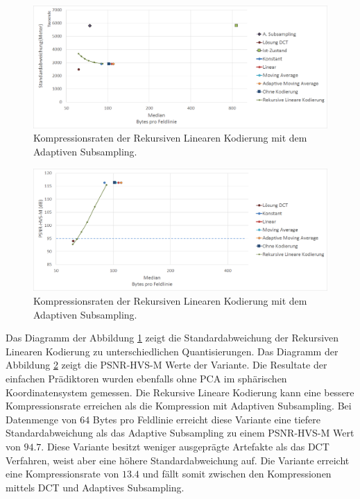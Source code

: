 \begin{figure}[!htbp]
	\center
	\includegraphics[width=1\textwidth,keepaspectratio]{./pictures/resultate/loesung2/variante2/resultate.png}
	
	\caption{Kompressionsraten der Rekursiven Linearen Kodierung mit dem Adaptiven Subsampling.}
	\label{resultate:loesung2:adaptive:median}
\end{figure}
\begin{figure}[!htbp]
	\includegraphics[width=1\textwidth,keepaspectratio]{./pictures/resultate/loesung2/variante2/resultate_psnr.png}
	
	\caption{Kompressionsraten der Rekursiven Linearen Kodierung mit dem Adaptiven Subsampling.}
	\label{resultate:loesung2:adaptive:median_psnr}
\end{figure}
Das Diagramm der Abbildung \ref{resultate:loesung2:adaptive:median} zeigt die Standardabweichung der Rekursiven Linearen Kodierung zu unterschiedlichen Quantisierungen. Das Diagramm der Abbildung \ref{resultate:loesung2:adaptive:median_psnr} zeigt die PSNR-HVS-M Werte der Variante. Die Resultate der einfachen Prädiktoren wurden ebenfalls ohne PCA im sphärischen Koordinatensystem gemessen. Die Rekursive Lineare Kodierung kann eine bessere Kompressionsrate erreichen als die Kompression mit Adaptiven Subsampling. Bei Datenmenge von $64$ Bytes pro Feldlinie erreicht diese Variante eine tiefere Standardabweichung als das Adaptive Subsampling zu einem PSNR-HVS-M Wert von $94.7$. Diese Variante besitzt weniger ausgeprägte Artefakte als das DCT Verfahren, weist aber eine höhere Standardabweichung auf. Die Variante erreicht eine Kompressionsrate von $13.4$ und fällt somit zwischen den Kompressionen mittels DCT und Adaptives Subsampling.

